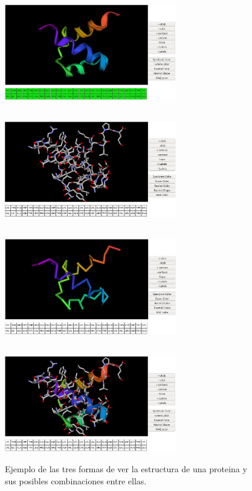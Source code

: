 \documentclass{article}
\begin{document}
\begin{itemize}
	\begin{figure}[H]
		\centering
		\begin{multicols}{2}
			\includegraphics[width=7.5cm,height=5cm]{img/papers/argos2}\par 
			\includegraphics[width=7.5cm,height=5cm]{img/papers/argos3}\par 
			\includegraphics[width=7.5cm,height=5cm]{img/papers/argos4}\par 
			\includegraphics[width=7.5cm,height=5cm]{img/papers/argos6}\par 
		\end{multicols}
		\caption{Ejemplo de las tres formas de ver la estructura de una proteina y sus posibles combinaciones entre ellas.}
		\label{fig:argos2}
	\end{figure}


\end{itemize}
\end{document}
